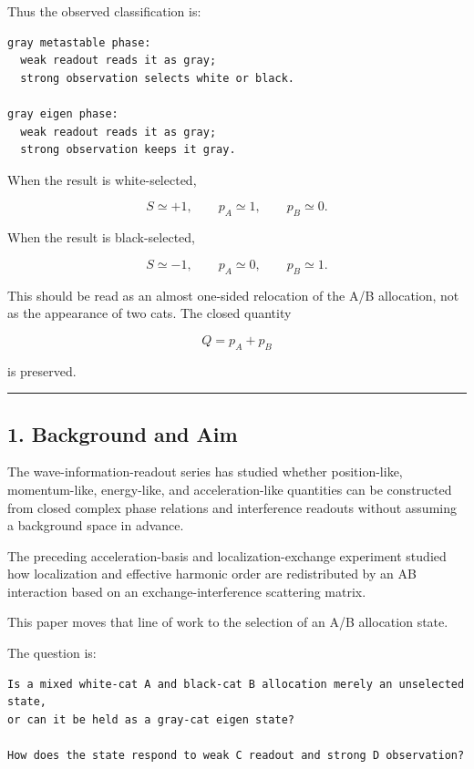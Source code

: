 \documentclass{article}
\begin{document}
Thus the observed classification is:

\begin{verbatim}
gray metastable phase:
  weak readout reads it as gray;
  strong observation selects white or black.

gray eigen phase:
  weak readout reads it as gray;
  strong observation keeps it gray.
\end{verbatim}

When the result is white-selected,

\[
S \simeq +1,\qquad p_A\simeq 1,\qquad p_B\simeq 0.
\]

When the result is black-selected,

\[
S \simeq -1,\qquad p_A\simeq 0,\qquad p_B\simeq 1.
\]

This should be read as an almost one-sided relocation of the A/B
allocation, not as the appearance of two cats. The closed quantity

\[
Q=p_A+p_B
\]

is preserved.

\begin{center}\rule{0.5\linewidth}{0.5pt}\end{center}

\subsection{1. Background and Aim}\label{background-and-aim}

The wave-information-readout series has studied whether position-like,
momentum-like, energy-like, and acceleration-like quantities can be
constructed from closed complex phase relations and interference
readouts without assuming a background space in advance.

The preceding acceleration-basis and localization-exchange experiment
studied how localization and effective harmonic order are redistributed
by an AB interaction based on an exchange-interference scattering
matrix.

This paper moves that line of work to the selection of an A/B allocation
state.

The question is:

\begin{verbatim}
Is a mixed white-cat A and black-cat B allocation merely an unselected state,
or can it be held as a gray-cat eigen state?

How does the state respond to weak C readout and strong D observation?
\end{verbatim}
\end{document}
